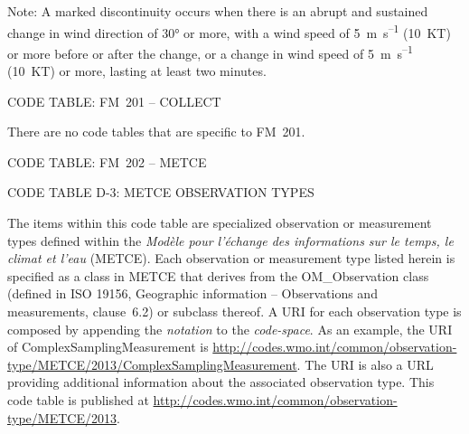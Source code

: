 Note: A marked discontinuity occurs when there is an abrupt and sustained change in wind direction of 30° or more, with a wind speed of 5~m~s\textsuperscript{--1} (10~KT) or more before or after the change, or a change in wind speed of 5~m~s\textsuperscript{--1} (10~KT) or more, lasting at least two minutes.

CODE TABLE: FM~201 -- COLLECT

There are no code tables that are specific to FM~201.

CODE TABLE: FM~202 -- METCE

CODE TABLE D-3: METCE OBSERVATION TYPES

The items within this code table are specialized observation or measurement types defined within the \emph{Modèle pour l'échange des informations sur le temps, le climat et l'eau} (METCE). Each observation or measurement type listed herein is specified as a class in METCE that derives from the OM\_Observation class (defined in ISO 19156, Geographic information -- Observations and measurements, clause~6.2) or subclass thereof. A URI for each observation type is composed by appending the \emph{notation} to the \emph{code-space}. As an example, the URI of ComplexSamplingMeasurement is \url{http://codes.wmo.int/common/observation-type/METCE/2013/ComplexSamplingMeasurement}. The URI is also a URL providing additional information about the associated observation type. This code table is published at \url{http://codes.wmo.int/common/observation-type/METCE/2013}.

